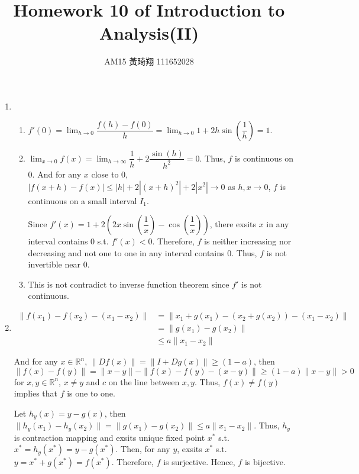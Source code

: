 \documentclass[12pt]{article}
\title{Homework 10 of Introduction to Analysis(II)}
\author{AM15 黃琦翔 111652028}
\begin{document}
\maketitle
\begin{enumerate}
    \item \begin{enumerate}
        \item $f'(0) = \displaystyle\lim_{h\to 0} \dfrac{f(h) - f(0)}{h} = \displaystyle\lim_{h\to 0} 1 + 2h\sin(\dfrac{1}{h}) = 1$.
        
        \item $\displaystyle\lim_{x\to 0} f(x) = \displaystyle\lim_{h\to \infty} \dfrac{1}{h} + 2\dfrac{\sin(h)}{h^2} = 0$.
        Thus, $f$ is continuous on $0$.
        And for any $x$ close to $0$, $|f(x+h) - f(x)| \leq |h| + 2|(x+h)^2| + 2|x^2| \to 0$ as $h, x \to 0$, $f$ is continuous on a small interval $I_1$.

        Since $f'(x) = 1 + 2(2x\sin(\dfrac{1}{x}) - \cos(\dfrac{1}{x}))$, there exsits $x$ in any interval contains $0$ s.t. $f'(x)< 0$.
        Therefore, $f$ is neither increasing nor decreasing and not one to one in any interval contains $0$.
        Thus, $f$ is not invertible near $0$.

        \item This is not contradict to inverse function theorem since $f'$ is not continuous.
    \end{enumerate}

    \item \begin{align*}
        \| f(x_1) - f(x_2) - (x_1 - x_2)\| &= \| x_1 + g(x_1) - (x_2 + g(x_2)) - (x_1 - x_2) \| \\
        &= \| g(x_1) - g(x_2)\|\\
        &\leq a\| x_1 - x_2\|
    \end{align*}

    And for any $x\in \mathbb{R}^n$, $\|Df(x)\| = \|I + Dg(x)\| \geq (1-a)$,
    then $\| f(x) - f(y)\| = \|x-y\| - \| f(x) - f(y) - (x-y)\| \geq (1-a)\|x-y\| > 0$ for $x, y\in \mathbb{R}^n$, $x\neq y$ and $c$ on the line between $x, y$.
    Thus, $f(x) \neq f(y)$ implies that $f$ is one to one.

    Let $h_y(x) = y - g(x)$, then $\| h_y(x_1) - h_y(x_2)\| = \| g(x_1) - g(x_2) \| \leq a\|x_1 - x_2\|$.
    Thus, $h_y$ is contraction mapping and exsits unique fixed point $x^*$ s.t. $x^* = h_y(x^*) = y - g(x^*)$.
    \newpage
    Then, for any $y$, exsits $x^*$ s.t. $y = x^* + g(x^*) = f(x^*)$.
    Therefore, $f$ is surjective.
    Hence, $f$ is bijective.
   

\end{enumerate}
\end{document}
